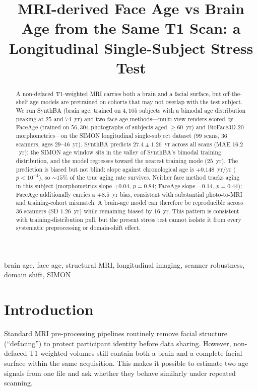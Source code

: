 \documentclass{midl} %
\title[MRI-derived Face Age vs Brain Age]{MRI-derived Face Age vs Brain Age from the Same T1 Scan: a Longitudinal Single-Subject Stress Test}
\begin{document}
\maketitle

\begin{abstract}
  A non-defaced T1-weighted MRI carries both a brain and a facial surface,
  but off-the-shelf age models are pretrained on cohorts that may not
  overlap with the test subject.  We run SynthBA (brain age, trained on
  $4{,}105$ subjects with a bimodal age distribution peaking at $25$ and
  $74$~yr) and two face-age methods---multi-view renders scored by FaceAge
  (trained on $56{,}304$ photographs of subjects aged $\geq 60$~yr) and
  BioFace3D-20 morphometrics---on the SIMON longitudinal single-subject
  dataset ($99$ scans, $36$ scanners, ages $29$--$46$~yr).
  SynthBA predicts $27.4 \pm 1.26$~yr across all scans (MAE $16.2$~yr): the
  SIMON age window sits in the valley of SynthBA's bimodal training
  distribution, and the model regresses toward the nearest training mode
  ($25$~yr).  The prediction is biased but not blind: slope against
  chronological age is $+0.148$~yr/yr ($p<10^{-4}$), so $\sim 15\%$ of the
  true aging rate survives.  Neither face method tracks aging in this
  subject (morphometrics slope $+0.04$, $p{=}0.84$; FaceAge slope
  $-0.14$, $p{=}0.44$); FaceAge additionally carries a $+8.5$~yr bias,
  consistent with substantial photo-to-MRI and training-cohort mismatch.
  A brain-age model can therefore be reproducible across $36$ scanners (SD
  $1.26$~yr) while remaining biased by $16$~yr. This pattern is consistent
  with training-distribution pull, but the present stress test cannot isolate
  it from every systematic preprocessing or domain-shift effect.
\end{abstract}

\begin{keywords}
  brain age, face age, structural MRI, longitudinal imaging, scanner robustness,
  domain shift, SIMON
\end{keywords}

\section{Introduction}

Standard MRI pre-processing pipelines routinely remove facial structure
(``defacing'') to protect participant identity before data sharing.
However, non-defaced T1-weighted volumes still contain both a brain and a
complete facial surface within the same acquisition.  This makes it possible
to estimate two age signals from one file and ask whether they behave
similarly under repeated scanning.
\end{document}
